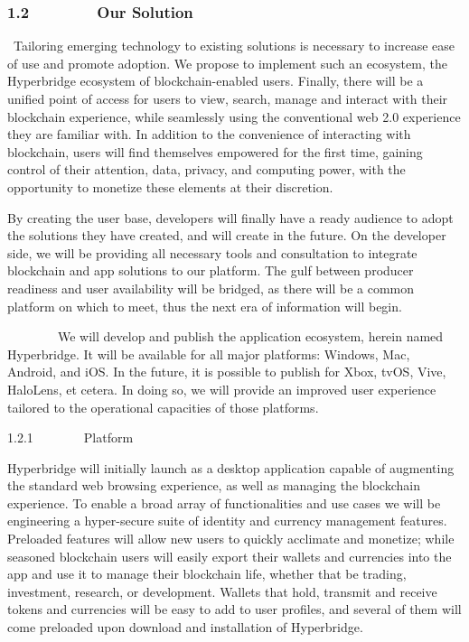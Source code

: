 \documentclass[]{article}
\begin{document}
\hypertarget{h.edvz3heatl5d}{%
\subsubsection{\texorpdfstring{{1.2~~~~~~~~Our
Solution}}{1.2~~~~~~~~Our Solution}}\label{h.edvz3heatl5d}}

{~Tailoring emerging technology to existing solutions is necessary to
increase ease of use and promote adoption. We propose to implement such
an ecosystem, the Hyperbridge ecosystem of blockchain-enabled users.
Finally, there will be a unified point of access for users to view,
search, manage and interact with their blockchain experience, while
seamlessly using the conventional web 2.0 experience they are familiar
with. In addition to the convenience of interacting with blockchain,
users will find themselves empowered for the first time, gaining control
of their attention, data, privacy, and computing power, with the
opportunity to monetize these elements at their discretion. }

{}

{By creating the user base, developers will finally have a ready
audience to adopt the solutions they have created, and will create in
the future. On the developer side, we will be providing all necessary
tools and consultation to integrate blockchain and app solutions to our
platform. The gulf between producer readiness and user availability will
be bridged, as there will be a common platform on which to meet, thus
the next era of information will begin.}

{}

{~~~~~~~~We will develop and publish the application ecosystem, herein
named Hyperbridge. It will be available for all major platforms:
Windows, Mac, Android, and iOS. In the future, it is possible to publish
for Xbox, tvOS, Vive, HaloLens, et cetera. In doing so, we will provide
an improved user experience tailored to the operational capacities of
those platforms. }

{}

{1.2.1~~~~~~~~Platform}

{Hyperbridge will initially launch as a desktop application capable of
augmenting the standard web browsing experience, as well as managing the
blockchain experience. To enable a broad array of functionalities and
use cases we will be engineering a hyper-secure suite of identity and
currency management features. Preloaded features will allow new users to
quickly acclimate and monetize; while seasoned blockchain users will
easily export their wallets and currencies into the app and use it to
manage their blockchain life, whether that be trading, investment,
research, or development. Wallets that hold, transmit and receive tokens
and currencies will be easy to add to user profiles, and several of them
will come preloaded upon download and installation of Hyperbridge.}
\end{document}
